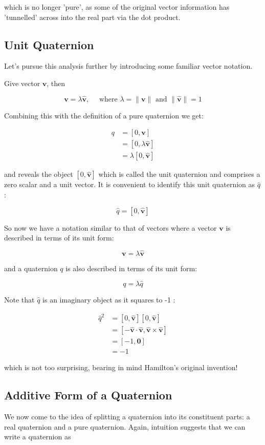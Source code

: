\documentclass[10pt]{article}
\begin{document}
which is no longer 'pure', as some of the original vector information has 'tunnelled' across into the real part via the dot product.

\subsection{Unit Quaternion}
Let's pursue this analysis further by introducing some familiar vector notation.

Give vector $\mathbf{v}$, then

$$
\mathbf{v}=\lambda \hat{\mathbf{v}}, \quad \text { where } \lambda=\|\mathbf{v}\| \text { and }\|\hat{\mathbf{v}}\|=1
$$

Combining this with the definition of a pure quaternion we get:

$$
\begin{aligned}
q & =[0, \mathbf{v}] \\
& =[0, \lambda \hat{\mathbf{v}}] \\
& =\lambda[0, \hat{\mathbf{v}}]
\end{aligned}
$$

and reveals the object $[0, \hat{\mathbf{v}}]$ which is called the unit quaternion and comprises a zero scalar and a unit vector. It is convenient to identify this unit quaternion as $\hat{q}$ :

$$
\hat{q}=[0, \hat{\mathbf{v}}]
$$

So now we have a notation similar to that of vectors where a vector $\mathbf{v}$ is described in terms of its unit form:

$$
\mathbf{v}=\lambda \hat{\mathbf{v}}
$$

and a quaternion $q$ is also described in terms of its unit form:

$$
q=\lambda \hat{q}
$$

Note that $\hat{q}$ is an imaginary object as it squares to -1 :

$$
\begin{aligned}
\hat{q}^{2} & =[0, \hat{\mathbf{v}}][0, \hat{\mathbf{v}}] \\
& =[-\hat{\mathbf{v}} \cdot \hat{\mathbf{v}}, \hat{\mathbf{v}} \times \hat{\mathbf{v}}] \\
& =[-1, \mathbf{0}] \\
& =-1
\end{aligned}
$$

which is not too surprising, bearing in mind Hamilton's original invention!

\subsection{Additive Form of a Quaternion}
We now come to the idea of splitting a quaternion into its constituent parts: a real quaternion and a pure quaternion. Again, intuition suggests that we can write a quaternion as
\end{document}
